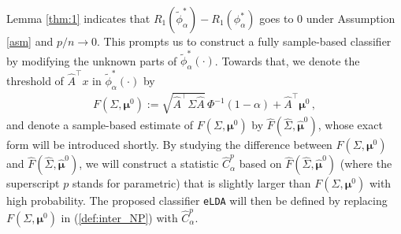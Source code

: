 \documentclass[12pt]{article}
\numberwithin{equation}{section}
\theoremstyle{remark}
\newcommand{\1}{{\rm 1}\kern-0.24em{\rm I}}
\begin{document}

Lemma \ref{thm:1} indicates that $R_1(\tilde{\phi}_\alpha^*)-  R_1({\phi}_\alpha^*)$ goes to 0 under Assumption \ref{asm} and $p/n \to 0$.  This prompts us to construct a fully sample-based classifier by modifying the unknown parts of $\tilde{\phi}_\alpha^*(\cdot)$. Towards that, we denote the threshold of $\widehat A^{\top} x$ in $\tilde{\phi}_\alpha^*(\cdot)$ by
 \begin{align}\label{def:F}
F(\Sigma, {\bm{\mu}}^0):= \sqrt{\widehat{A} ^{\top} \Sigma \widehat{A} } \, \Phi^{-1}(1-\alpha) +\widehat{A} ^{\top} {\bm{\mu}}^0\,,
 \end{align}
and denote a sample-based estimate of $F(\Sigma, {\bm{\mu}}^0)$ by $\widehat F(\widehat\Sigma, \hat{\bm{\mu}}^0)$, whose exact form will be introduced shortly. By studying the difference between $ F(\Sigma, {\bm{\mu}}^0)$ and $\widehat F(\widehat\Sigma, \hat{\bm{\mu}}^0)$, we will construct a statistic $\widehat C_\alpha^p$  based on $\widehat F(\widehat\Sigma, \hat{\bm{\mu}}^0)$ (where the superscript $p$ stands for parametric) that is slightly larger than  $F(\Sigma, {\bm{\mu}}^0)$  with high probability.  The proposed classifier \verb+eLDA+ will then be defined by replacing  $F(\Sigma, {\bm{\mu}}^0)$ in (\ref{def:inter_NP}) with $\widehat C_\alpha^p$. 





\end{document}

